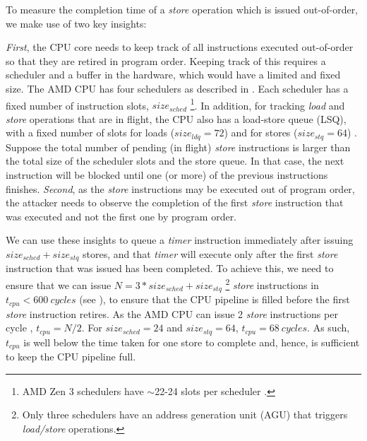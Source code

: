 To measure the completion time of a \textit{store} operation which is issued out-of-order, we make use of two key insights:

\textit{First}, the CPU core needs to keep track of all instructions executed out-of-order so that they are retired in program order.
Keeping track of this requires a scheduler and a buffer in the hardware, which would have a limited and fixed size.
The AMD CPU has four schedulers as described in . Each scheduler has a fixed number of instruction slots, $size_{sched}$
\footnote{AMD Zen 3 schedulers have $\sim$22-24 slots per scheduler \cite{gast2023squip}.}.
In addition, for tracking \textit{load} and \textit{store} operations that are in flight, the CPU also has a load-store queue (LSQ), with a fixed number of slots for loads ($size_{ldq} = 72$) and for stores ($size_{stq} = 64$) \cite{amd_7003_software_optimization_guide}.
Suppose the total number of pending (in flight) \textit{store} instructions is larger than the total size of the scheduler slots and the store queue. 
In that case, the next instruction will be blocked until one (or more) of the previous instructions finishes.
\textit{Second}, as the \textit{store} instructions may be executed out of program order, the attacker needs to observe the completion of the first \textit{store} instruction that was executed and not the first one by program order.

We can use these insights to queue a \textit{timer} instruction immediately after issuing $size_{sched} + size_{stq}$ stores, and that \textit{timer} will execute only after the first \textit{store} instruction that was issued has been completed.
To achieve this, we need to ensure that we can issue $N = 3 * size_{sched} + size_{stq}$ 
\footnote{Only three schedulers have an address generation unit (AGU) that triggers \textit{load/store} operations.}
\textit{store} instructions in $t_{cpu} < 600~cycles$ (see ), to ensure that the CPU pipeline is filled before the first \textit{store} instruction retires.
As the AMD CPU can issue 2 \textit{store} instructions per cycle \cite{amd_7003_software_optimization_guide}, $t_{cpu} = N/2$.
For $size_{sched} = 24$ and $size_{stq} = 64$, $t_{cpu} = 68~cycles$.
As such, $t_{cpu}$ is well below the time taken for one store to complete and, hence, is sufficient to keep the CPU pipeline full.

